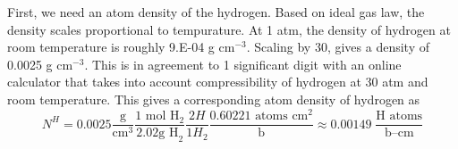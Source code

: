 \documentclass[12pt]{article}
\newenvironment{solnum}[2][Solution]{\begin{trivlist}
\item[\hskip \labelsep {\bfseries #1}\hskip \labelsep {\bfseries #2:}]\hspace{0.3in}\newline\newline}{\end{trivlist}}
\begin{document}
\clearpage

\begin{solnum}{2}

First, we need an atom density of the hydrogen.  Based on ideal gas law, the density
scales proportional to tempurature.  At 1 atm, the density of hydrogen at room
temperature is roughly 9.E-04 g cm$^{-3}$.  Scaling by 30, gives a density of 0.0025
g cm$^{-3}$.  This is in agreement to 1 significant digit with an online calculator that takes into account
compressibility of hydrogen at 30 atm and room temperature.  This gives a
corresponding atom density of hydrogen as
\begin{equation}
    N^{H} = 0.0025 \frac{\text{g}}{\text{cm}^3}\frac{1\text{ mol H}_2}{2.02\text {g
    H}_2}\frac{2 H}{1 H_2}\frac{0.60221\text{ atoms cm}^2}{\text{b}} \approx
    0.00149\;\frac{\text{H atoms}}{\text{b--cm}}
\end{equation}


\end{solnum}
\end{document}
